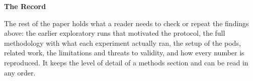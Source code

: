 \bigskip
\begin{center}\large\textbf{The Record}\end{center}
\noindent The rest of the paper holds what a reader needs to check or repeat the findings above: the earlier
exploratory runs that motivated the protocol, the full methodology with what each experiment actually ran, the setup
of the pods, related work, the limitations and threats to validity, and how every number is reproduced. It keeps the
level of detail of a methods section and can be read in any order.
